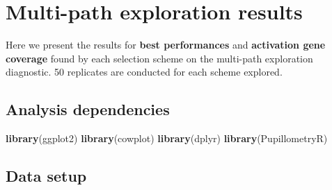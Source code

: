 \documentclass[]{book}
\newenvironment{Shaded}{\begin{snugshade}}{\end{snugshade}}
\newcommand{\KeywordTok}[1]{\textcolor[rgb]{0.13,0.29,0.53}{\textbf{#1}}}
\newcommand{\NormalTok}[1]{#1}
\begin{document}
\hypertarget{multi-path-exploration-results}{%
\chapter{Multi-path exploration results}\label{multi-path-exploration-results}}

Here we present the results for \textbf{best performances} and \textbf{activation gene coverage} found by each selection scheme on the multi-path exploration diagnostic.
50 replicates are conducted for each scheme explored.

\hypertarget{analysis-dependencies-3}{%
\section{Analysis dependencies}\label{analysis-dependencies-3}}

\begin{Shaded}
\begin{Highlighting}[]
\KeywordTok{library}\NormalTok{(ggplot2)}
\KeywordTok{library}\NormalTok{(cowplot)}
\KeywordTok{library}\NormalTok{(dplyr)}
\KeywordTok{library}\NormalTok{(PupillometryR)}
\end{Highlighting}
\end{Shaded}

\hypertarget{data-setup-3}{%
\section{Data setup}\label{data-setup-3}}
\end{document}
